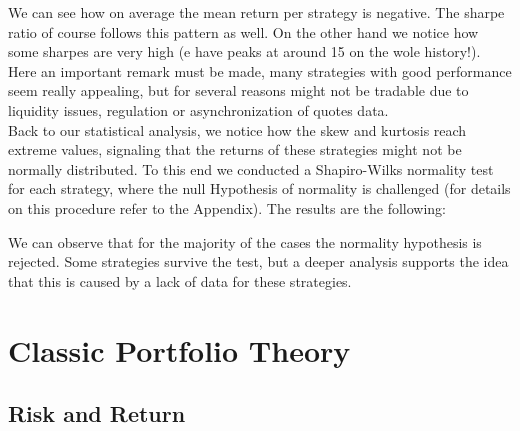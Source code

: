 \documentclass[a4paper]{article}
\numberwithin{equation}{subsection}
\begin{document}
We can see how on average the mean return per strategy is negative. The sharpe ratio of course follows this pattern as well. On the other hand we notice how some sharpes are very high (e have peaks at around 15 on the wole history!). Here an important remark must be made, many strategies with good performance seem really appealing, but for several reasons might not be tradable due to liquidity issues, regulation or asynchronization of quotes data.\\
Back to our statistical analysis, we notice how the skew and kurtosis reach extreme values, signaling that the returns of these strategies might not be normally distributed. To this end we conducted a Shapiro-Wilks normality test for each strategy, where the null Hypothesis of normality is challenged (for details on this procedure refer to the Appendix). The results are the following:

We can observe that for the majority of the cases the normality hypothesis is rejected. Some strategies survive the test, but a deeper analysis supports the idea that this is caused by a lack of data for these strategies. 


\section{Classic Portfolio Theory}

\subsection{Risk and Return}
\end{document}
